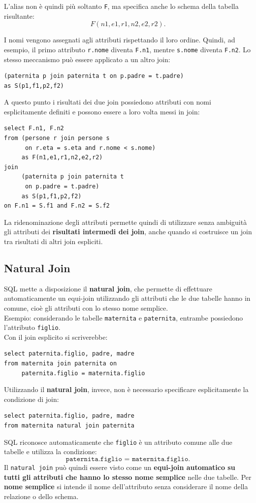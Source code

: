 \noindent L'alias non è quindi più soltanto \texttt{F}, ma specifica anche lo schema
della tabella risultante:
\[
F(n1,e1,r1,n2,e2,r2).
\]

\noindent I nomi vengono assegnati agli attributi rispettando il loro ordine. Quindi,
ad esempio, il primo attributo \texttt{r.nome} diventa \texttt{F.n1}, mentre
\texttt{s.nome} diventa \texttt{F.n2}.
Lo stesso meccanismo può essere applicato a un altro join:
\begin{verbatim}
(paternita p join paternita t on p.padre = t.padre)
as S(p1,f1,p2,f2)
\end{verbatim}

\noindent A questo punto i risultati dei due join possiedono attributi con nomi
esplicitamente definiti e possono essere a loro volta messi in join:
\begin{verbatim}
select F.n1, F.n2
from (persone r join persone s
      on r.eta = s.eta and r.nome < s.nome)
     as F(n1,e1,r1,n2,e2,r2)
join
     (paternita p join paternita t
      on p.padre = t.padre)
     as S(p1,f1,p2,f2)
on F.n1 = S.f1 and F.n2 = S.f2
\end{verbatim}

\noindent La ridenominazione degli attributi permette quindi di utilizzare senza ambiguità gli attributi dei \textbf{risultati intermedi dei join}, anche
quando si costruisce un join tra risultati di altri join espliciti.

\subsection{Natural Join}
SQL mette a disposizione il \textbf{natural join}, che permette di effettuare
automaticamente un equi-join utilizzando gli attributi che le due tabelle
hanno in comune, cioè gli attributi con lo stesso nome semplice.\\
\textcolor{verdeEsempio}{Esempio:} considerando le tabelle \texttt{maternita} e \texttt{paternita},
entrambe possiedono l'attributo \texttt{figlio}.\\ Con il join esplicito si
scriverebbe:
\begin{verbatim}
select paternita.figlio, padre, madre
from maternita join paternita on
     paternita.figlio = maternita.figlio
\end{verbatim}
\noindent Utilizzando il \textbf{natural join}, invece, non è necessario specificare
esplicitamente la condizione di join:
\begin{verbatim}
select paternita.figlio, padre, madre
from maternita natural join paternita
\end{verbatim}
\noindent SQL riconosce automaticamente che \texttt{figlio} è un attributo comune alle
due tabelle e utilizza la condizione:
\[
\texttt{paternita.figlio = maternita.figlio}.
\]
Il \texttt{natural join} può quindi essere visto come un \textbf{equi-join
automatico su tutti gli attributi che hanno lo stesso nome semplice} nelle
due tabelle.
Per \textbf{nome semplice} si intende il nome dell'attributo senza considerare
il nome della relazione o dello schema. 

